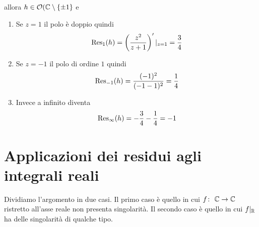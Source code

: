 \begin{example}
\begin{enumerate}
         allora $h \in \mathcal{O}(\mathbb{C} \setminus \left\{ \pm 1 \right\}$ e 
           \begin{enumerate}
             \item Se $z = 1$ il polo è doppio quindi 
               \begin{equation*}
                 \operatorname{Res}_1(h) = \left(\frac{z^2}{z+1}\right)'|_{z = 1} = \frac{3}{4}
               \end{equation*}
             \item Se $z = -1$ il polo di ordine $1$ quindi
               \begin{equation*}
                 \operatorname{Res}_{-1}(h) = \frac{(-1)^2}{(-1-1)^2} = \frac{1}{4} 
               \end{equation*}
             \item Invece a infinito diventa 
               \begin{equation*}
                 \operatorname{Res}_\infty(h) = - \frac{3}{4} - \frac{1}{4} = -1
               \end{equation*}
           \end{enumerate}
  \end{enumerate}
\end{example}


\section{Applicazioni dei residui agli integrali reali}

Dividiamo l'argomento in due casi. Il primo caso è quello in cui
$f \colon\ \mathbb{C} \rightarrow \mathbb{C}$ ristretto all'asse reale non presenta singolarità. Il
secondo caso è quello in cui $f|_{\mathbb{R}}$ ha delle singolarità di qualche tipo.


